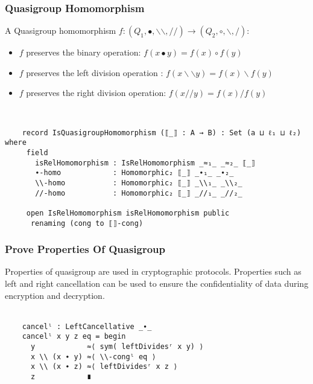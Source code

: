 \documentclass[xcolor={dvipsnames}]{beamer}
\begin{document}

\begin{frame}[fragile]
  \frametitle{Quasigroup Homomorphism}
    A Quasigroup homomorphism \( f:(Q_1,∙,\backslash \backslash,//) \rightarrow
    (Q_2,\circ,\backslash,/) \):
    \begin{itemize}
        \item $f$ preserves the binary operation: $f(x∙y) = f(x) \circ f(y)$
        \item $f$ preserves the left division operation : $f(x\backslash \backslash y) = f(x)\backslash f(y)$
        \item $f$ preserves the right division operation: $f(x//y) = f(x)/f(y)$
    \end{itemize}
\\
\begin{verbatim}
    record IsQuasigroupHomomorphism (⟦_⟧ : A → B) : Set (a ⊔ ℓ₁ ⊔ ℓ₂) where
     field
       isRelHomomorphism : IsRelHomomorphism _≈₁_ _≈₂_ ⟦_⟧
       ∙-homo            : Homomorphic₂ ⟦_⟧ _∙₁_ _∙₂_
       \\-homo           : Homomorphic₂ ⟦_⟧ _\\₁_ _\\₂_
       //-homo           : Homomorphic₂ ⟦_⟧ _//₁_ _//₂_
  
     open IsRelHomomorphism isRelHomomorphism public
      renaming (cong to ⟦⟧-cong)
\end{verbatim}
\end{frame}
  
  \begin{frame}[fragile]
    \frametitle{Prove Properties Of Quasigroup}  

      Properties of quasigroup are used in cryptographic
      protocols. Properties such as left and right cancellation can be
      used to ensure the confidentiality of data during encryption and
      decryption.
      \\ \\
\begin{center}
  \centering
  \begin{verbatim}
    cancelˡ : LeftCancellative _∙_
    cancelˡ x y z eq = begin
      y            ≈⟨ sym( leftDividesʳ x y) ⟩
      x \\ (x ∙ y) ≈⟨ \\-congˡ eq ⟩
      x \\ (x ∙ z) ≈⟨ leftDividesʳ x z ⟩
      z            ∎
  \end{verbatim}
\end{center}

  \end{frame}
\end{document}
